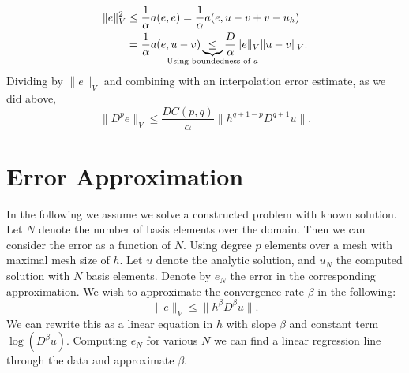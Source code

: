 \begin{align}
    \| e \|_V^2 &\leq \frac{1}{\alpha} a(e, e) = \frac{1}{\alpha}a(e, u- v + v - u_h) \\
                &= \frac{1}{\alpha} a(e, u - v)
                \underbrace{\leq}_{\mathclap{\text{Using boundedness of \(a
        \)}}} \frac{D}{\alpha}\| e \|_V \| u - v \|_V.
\end{align}
Dividing by \( \|e\|_V \) and combining with an interpolation error estimate,
as we did above, 
\begin{equation}
    \|D^pe \|_V \leq \frac{D C(p, q)}{\alpha} \|h^{q+1-p} D^{q+1}u \|.
\end{equation}

\section{Error Approximation}

In the following we assume we solve a constructed problem with known solution.
Let \( N \) denote the number of basis elements over the domain. Then we can
consider the error as a function of \( N \). Using degree \( p \) elements over
a mesh with maximal mesh size of \( h \). Let \( u \) denote the analytic
solution, and \( u_N \) the computed solution with \( N \) basis elements.
Denote by \( e_N \) the error in the corresponding approximation.
We wish to approximate the convergence rate \( \beta \) in the following:
\begin{equation}
    \| e \|_V \leq \| h^\beta D^\beta u \|.
\end{equation}
We can rewrite this as a linear equation in \( h \) with slope \(\beta\) and
constant term \( \log(D^\beta u) \). Computing \( e_N \) for various \( N \) we
can find a linear regression line through the data and approximate \( \beta \).
